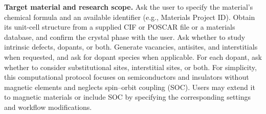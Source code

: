 \documentclass[aip,jap,reprint,amsmath,amssymb]{revtex4-2}
\begin{document}
\textbf{Target material and research scope.} Ask the user to specify the material's chemical formula and an available identifier (e.g., Materials Project ID). Obtain its unit-cell structure from a supplied CIF or POSCAR file or a materials database, and confirm the crystal phase with the user. Ask whether to study intrinsic defects, dopants, or both. Generate vacancies, antisites, and interstitials when requested, and ask for dopant species when applicable. For each dopant, ask whether to consider substitutional sites, interstitial sites, or both. For simplicity, this computational protocol focuses on semiconductors and insulators without magnetic elements and neglects spin--orbit coupling (SOC). Users may extend it to magnetic materials or include SOC by specifying the corresponding settings and workflow modifications.
\end{document}
